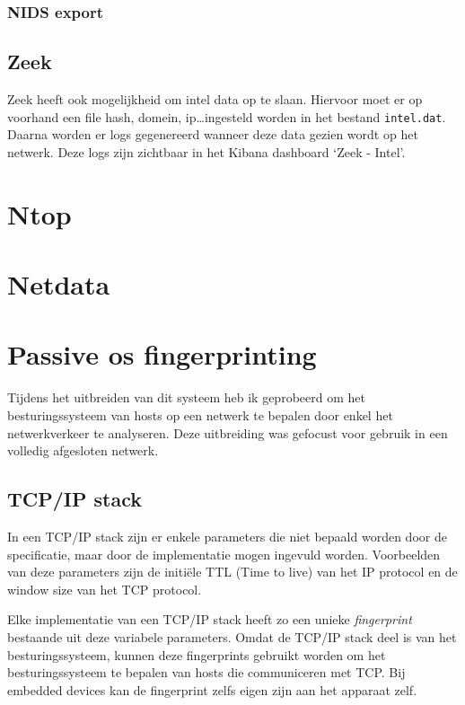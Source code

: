 \documentclass[a4paper,12pt]{report}
\begin{document}
\subsubsection{NIDS export}

\subsection{Zeek}
Zeek heeft ook mogelijkheid om intel data op te slaan.
Hiervoor moet er op voorhand een file hash, domein, ip\dots ingesteld worden in het bestand \lstinline|intel.dat|.
Daarna worden er logs gegenereerd wanneer deze data gezien wordt op het netwerk.
Deze logs zijn zichtbaar in het Kibana dashboard `Zeek - Intel'.

\section{Ntop}
\section{Netdata}

\section{Passive os fingerprinting}
Tijdens het uitbreiden van dit systeem heb ik geprobeerd om het besturingssysteem van hosts op een netwerk te bepalen door enkel het netwerkverkeer te analyseren.
Deze uitbreiding was gefocust voor gebruik in een volledig afgesloten netwerk.
\subsection{TCP/IP stack}
In een TCP/IP stack zijn er enkele parameters die niet bepaald worden door de specificatie, maar door de implementatie mogen ingevuld worden.
Voorbeelden van deze parameters zijn de initiële TTL (Time to live) van het IP protocol en de window size van het TCP protocol.
\autocite{wikipedia:fingerprinting}

Elke implementatie van een TCP/IP stack heeft zo een unieke \emph{fingerprint} bestaande uit deze variabele parameters.
Omdat de TCP/IP stack deel is van het besturingssysteem, kunnen deze fingerprints gebruikt worden om het besturingssysteem te bepalen van hosts die communiceren met TCP.
Bij embedded devices kan de fingerprint zelfs eigen zijn aan het apparaat zelf.
\end{document}
